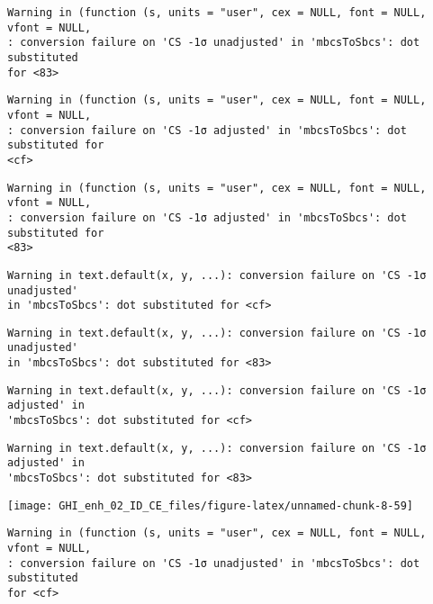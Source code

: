 \documentclass[
  10pt,
  a4paper,oneside]{article}
\begin{document}
\begin{verbatim}
Warning in (function (s, units = "user", cex = NULL, font = NULL, vfont = NULL,
: conversion failure on 'CS -1σ unadjusted' in 'mbcsToSbcs': dot substituted
for <83>
\end{verbatim}

\begin{verbatim}
Warning in (function (s, units = "user", cex = NULL, font = NULL, vfont = NULL,
: conversion failure on 'CS -1σ adjusted' in 'mbcsToSbcs': dot substituted for
<cf>
\end{verbatim}

\begin{verbatim}
Warning in (function (s, units = "user", cex = NULL, font = NULL, vfont = NULL,
: conversion failure on 'CS -1σ adjusted' in 'mbcsToSbcs': dot substituted for
<83>
\end{verbatim}

\begin{verbatim}
Warning in text.default(x, y, ...): conversion failure on 'CS -1σ unadjusted'
in 'mbcsToSbcs': dot substituted for <cf>
\end{verbatim}

\begin{verbatim}
Warning in text.default(x, y, ...): conversion failure on 'CS -1σ unadjusted'
in 'mbcsToSbcs': dot substituted for <83>
\end{verbatim}

\begin{verbatim}
Warning in text.default(x, y, ...): conversion failure on 'CS -1σ adjusted' in
'mbcsToSbcs': dot substituted for <cf>
\end{verbatim}

\begin{verbatim}
Warning in text.default(x, y, ...): conversion failure on 'CS -1σ adjusted' in
'mbcsToSbcs': dot substituted for <83>
\end{verbatim}

\begin{center}\texttt{[image: GHI\_enh\_02\_ID\_CE\_files/figure-latex/unnamed-chunk-8-59]} \end{center}

\begin{verbatim}
Warning in (function (s, units = "user", cex = NULL, font = NULL, vfont = NULL,
: conversion failure on 'CS -1σ unadjusted' in 'mbcsToSbcs': dot substituted
for <cf>
\end{verbatim}
\end{document}
